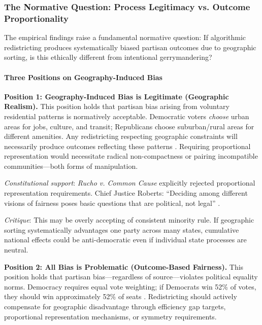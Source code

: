 
\subsubsection{The Normative Question: Process Legitimacy vs. Outcome Proportionality}

The empirical findings raise a fundamental normative question: If algorithmic redistricting produces systematically biased partisan outcomes due to geographic sorting, is this ethically different from intentional gerrymandering?

\paragraph{Three Positions on Geography-Induced Bias}

\textbf{Position 1: Geography-Induced Bias is Legitimate (Geographic Realism).}
This position holds that partisan bias arising from voluntary residential patterns is normatively acceptable. Democratic voters \textit{choose} urban areas for jobs, culture, and transit; Republicans choose suburban/rural areas for different amenities. Any redistricting respecting geographic constraints will necessarily produce outcomes reflecting these patterns \citep{rodden2019}. Requiring proportional representation would necessitate radical non-compactness or pairing incompatible communities---both forms of manipulation.

\textit{Constitutional support}: \textit{Rucho v. Common Cause} explicitly rejected proportional representation requirements. Chief Justice Roberts: ``Deciding among different visions of fairness poses basic questions that are political, not legal'' \citep{rucho2019}.

\textit{Critique}: This may be overly accepting of consistent minority rule. If geographic sorting systematically advantages one party across many states, cumulative national effects could be anti-democratic even if individual state processes are neutral.

\textbf{Position 2: All Bias is Problematic (Outcome-Based Fairness).}
This position holds that partisan bias---regardless of source---violates political equality norms. Democracy requires equal vote weighting; if Democrats win 52\% of votes, they should win approximately 52\% of seats \citep{mcgann2016}. Redistricting should actively compensate for geographic disadvantage through efficiency gap targets, proportional representation mechanisms, or symmetry requirements.

